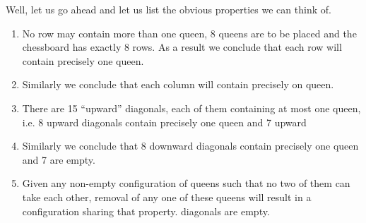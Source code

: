 Well, let us go ahead and let us list the obvious properties we can think of.

\begin{enumerate}[leftmargin=2\parindent, label=(\alph*)]
	\item \label{en:property-a}
	No row may contain more than one queen, 8 queens are to be placed and the chessboard has exactly 8 rows. As a result we conclude that each row will contain precisely one queen.
	\item Similarly we conclude that each column will contain precisely on queen.
	\item There are 15 ``upward'' diagonals, each of them containing at most one queen, i.e. 8 upward diagonals contain precisely one queen and 7 upward
	\item Similarly we conclude that 8 downward diagonals contain precisely one queen and 7 are empty.
	\item Given any non-empty configuration of queens such that no two of them can take each other, removal of any one of these queens will result in a configuration sharing that property.
diagonals are empty.
\end{enumerate}

